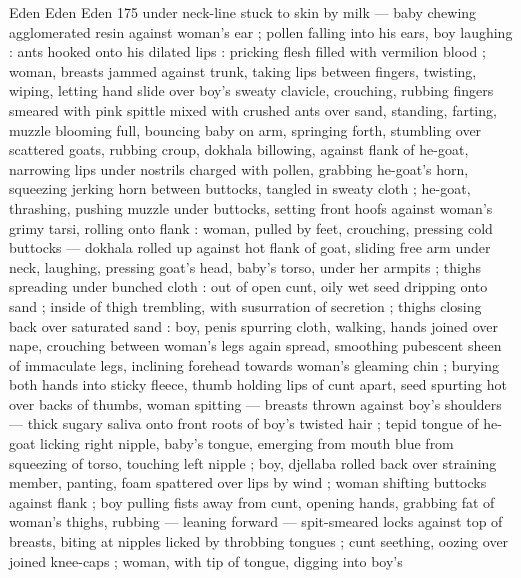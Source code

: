 Eden Eden Eden 175
under neck-line stuck to skin by milk — baby chewing agglomerated
resin against woman's ear ; pollen falling into his ears, boy laughing
: ants hooked onto his dilated lips : pricking flesh filled with vermilion
blood ; woman, breasts jammed against trunk, taking lips between
fingers, twisting, wiping, letting hand slide over boy's sweaty clavicle,
crouching, rubbing fingers smeared with pink spittle mixed with
crushed ants over sand, standing, farting, muzzle blooming full,
bouncing baby on arm, springing forth, stumbling over scattered
goats, rubbing croup, dokhala billowing, against flank of he-goat,
narrowing lips under nostrils charged with pollen, grabbing he-goat's
horn, squeezing jerking horn between buttocks, tangled in sweaty
cloth ; he-goat, thrashing, pushing muzzle under buttocks, setting
front hoofs against woman's grimy tarsi, rolling onto flank : woman,
pulled by feet, crouching, pressing cold buttocks — dokhala rolled
up against hot flank of goat, sliding free arm under neck, laughing,
pressing goat's head, baby's torso, under her armpits ; thighs
spreading under bunched cloth : out of open cunt, oily wet seed
dripping onto sand ; inside of thigh trembling, with susurration of
secretion ; thighs closing back over saturated sand : boy, penis
spurring cloth, walking, hands joined over nape, crouching between
woman's legs again spread, smoothing pubescent sheen of
immaculate legs, inclining forehead towards woman's gleaming chin
; burying both hands into sticky fleece, thumb holding lips of cunt
apart, seed spurting hot over backs of thumbs, woman spitting —
breasts thrown against boy's shoulders — thick sugary saliva onto
front roots of boy's twisted hair ; tepid tongue of he-goat licking
right nipple, baby's tongue, emerging from mouth blue from
squeezing of torso, touching left nipple ; boy, djellaba rolled back
over straining member, panting, foam spattered over lips by wind ;
woman shifting buttocks against flank ; boy pulling fists away from
cunt, opening hands, grabbing fat of woman's thighs, rubbing —
leaning forward — spit-smeared locks against top of breasts, biting
at nipples licked by throbbing tongues ; cunt seething, oozing over
joined knee-caps ; woman, with tip of tongue, digging into boy's

